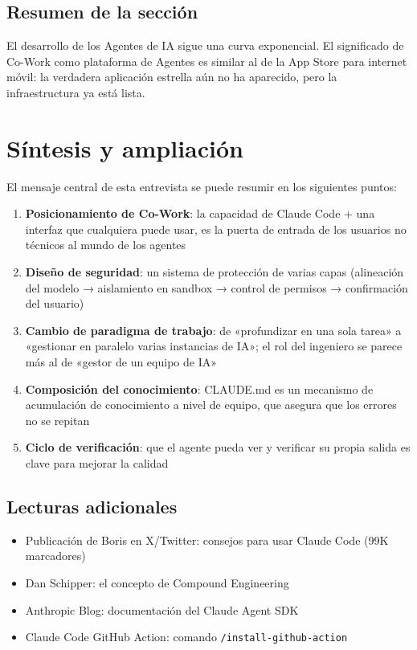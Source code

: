 \documentclass[a4paper]{article}
\begin{document}
\subsection{Resumen de la sección}

El desarrollo de los Agentes de IA sigue una curva exponencial. El significado de Co-Work como plataforma de Agentes es similar al de la App Store para internet móvil: la verdadera aplicación estrella aún no ha aparecido, pero la infraestructura ya está lista.
\section{Síntesis y ampliación}

El mensaje central de esta entrevista se puede resumir en los siguientes puntos:

\begin{enumerate}
    \item \textbf{Posicionamiento de Co-Work}: la capacidad de Claude Code + una interfaz que cualquiera puede usar, es la puerta de entrada de los usuarios no técnicos al mundo de los agentes
    \item \textbf{Diseño de seguridad}: un sistema de protección de varias capas (alineación del modelo → aislamiento en sandbox → control de permisos → confirmación del usuario)
    \item \textbf{Cambio de paradigma de trabajo}: de «profundizar en una sola tarea» a «gestionar en paralelo varias instancias de IA»; el rol del ingeniero se parece más al de «gestor de un equipo de IA»
    \item \textbf{Composición del conocimiento}: CLAUDE.md es un mecanismo de acumulación de conocimiento a nivel de equipo, que asegura que los errores no se repitan
    \item \textbf{Ciclo de verificación}: que el agente pueda ver y verificar su propia salida es clave para mejorar la calidad
\end{enumerate}

\subsection{Lecturas adicionales}

\begin{itemize}
    \item Publicación de Boris en X/Twitter: consejos para usar Claude Code (99K marcadores)
    \item Dan Schipper: el concepto de Compound Engineering
    \item Anthropic Blog: documentación del Claude Agent SDK
    \item Claude Code GitHub Action: comando \texttt{/install-github-action}
\end{itemize}

\end{document}
